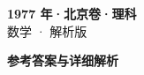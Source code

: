 \documentclass[zihao=-4, a4paper]{ctexart}
\begin{document}
\begin{center}
  {\Large\bfseries 1977 年·北京卷·理科}\\[4pt]
  {\large 数学 · 解析版}
\end{center}
\medskip
{}

\clearpage
{}
\begin{center}{\Large\bfseries 参考答案与详细解析}\end{center}
\medskip

\end{document}
